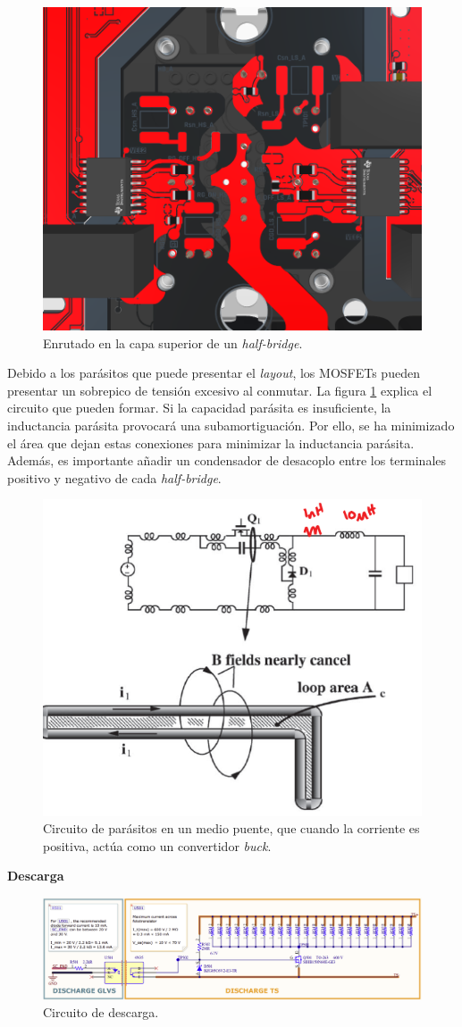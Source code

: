 \begin{figure}[H]
	\centering
	\includegraphics[width=0.7\linewidth]{fig/invPowerRouting}
	\caption{Enrutado en la capa superior de un \textit{half-bridge}.}
\end{figure}

Debido a los parásitos que puede presentar el \textit{layout}, los MOSFETs pueden presentar un sobrepico de tensión excesivo al conmutar. La figura \ref{lc-layout} explica el circuito que pueden formar. Si la capacidad parásita es insuficiente, la inductancia parásita provocará una subamortiguación. Por ello, se ha minimizado el área que dejan estas conexiones para minimizar la inductancia parásita. Además, es importante añadir un condensador de desacoplo entre los terminales positivo y negativo de cada \textit{half-bridge}. 
\begin{figure}[H]
	\centering
	\includegraphics[width=0.5\linewidth]{fig/LC-layout}
	\caption{Circuito de parásitos en un medio puente, que cuando la corriente es positiva, actúa como un convertidor \textit{buck}.}
	\label{lc-layout}
\end{figure}

\textbf{Descarga}
\begin{figure}[H]
	\centering
	\includegraphics[width=0.9\linewidth]{fig/discharge-sch}
	\caption{Circuito de descarga.}
\end{figure}


